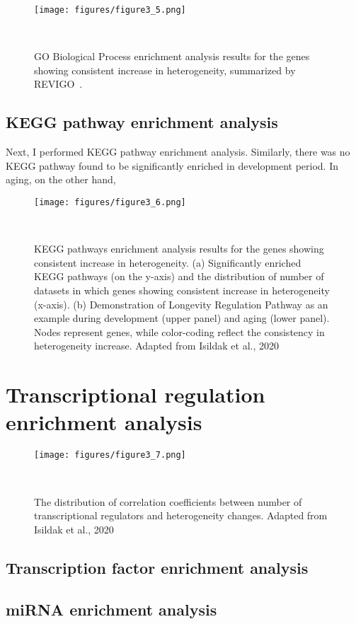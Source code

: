 \begin{landscape}
\begin{figure}[h]
    \centering
    \texttt{[image: figures/figure3\_5.png]}
    \caption{GO Biological Process enrichment analysis results for the genes showing consistent increase in heterogeneity, summarized by REVIGO~\cite{Supek2011}.
    }~\label{fig:fig3.5}
\end{figure}
\end{landscape}

\subsection{KEGG pathway enrichment analysis}
Next, I performed KEGG pathway enrichment analysis. Similarly, there was no KEGG pathway found to be significantly enriched in development period.
In aging, on the other hand, 

\begin{figure}[h]
    \centering
    \texttt{[image: figures/figure3\_6.png]}
    \caption{KEGG pathways enrichment analysis results for the genes showing consistent increase in heterogeneity.
    (a) Significantly enriched KEGG pathways (on the y-axis) and the distribution of number of datasets in which genes showing consistent increase in heterogeneity (x-axis). 
    (b) Demonstration of Longevity Regulation Pathway as an example during development (upper panel) and aging (lower panel). Nodes represent genes, while color-coding reflect the consistency in heterogeneity increase.
    Adapted from Isildak et al., 2020
    }~\label{fig:fig3.6}
\end{figure}

\section{Transcriptional regulation enrichment analysis}

\begin{figure}[h]
    \centering
    \texttt{[image: figures/figure3\_7.png]}
    \caption{The distribution of correlation coefficients between number of transcriptional regulators and heterogeneity changes. 
    Adapted from Isildak et al., 2020
    }~\label{fig:fig3.7}
\end{figure}

\subsection{Transcription factor enrichment analysis}

\subsection{miRNA enrichment analysis}